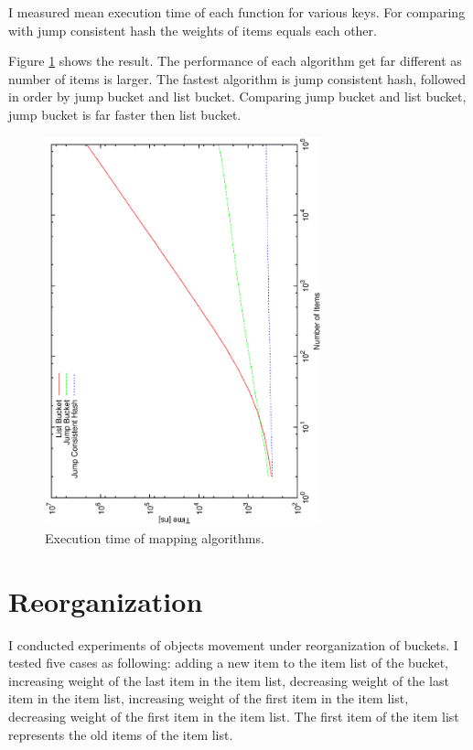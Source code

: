 \documentclass[a4paper,11pt]{article}
\begin{document}
I measured mean execution time of each function for various keys. For comparing with jump consistent hash the weights of items equals each other.

Figure \ref{performance} shows the result. The performance of each algorithm get far different as number of items is larger.
The fastest algorithm is jump consistent hash, followed in order by jump bucket and list bucket.
Comparing jump bucket and list bucket, jump bucket is far faster then list bucket.

\begin{figure}[tbp]
  \begin{center}
    \includegraphics[width=80mm, angle=-90]{performance.eps}
  \end{center}
  \caption{Execution time of mapping algorithms.}
  \label{performance}
\end{figure}

\section{Reorganization}

I conducted experiments of objects movement under reorganization of buckets.
I tested five cases as following: adding a new item to the item list of the bucket, increasing weight of the last item in the item list, decreasing weight of the last item in the item list, increasing weight of the first item in the item list, decreasing weight of the first item in the item list. The first item of the item list represents the old items of the item list.
\end{document}
